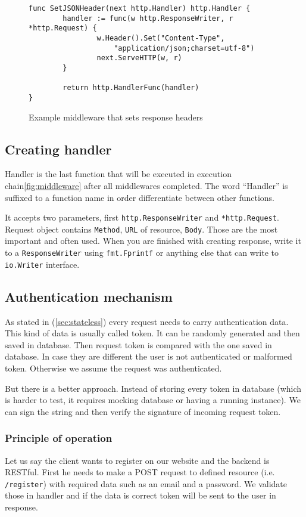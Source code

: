 \begin{figure}[!htbp]
\begin{verbatim}
func SetJSONHeader(next http.Handler) http.Handler {
        handler := func(w http.ResponseWriter, r *http.Request) {
                w.Header().Set("Content-Type",
                    "application/json;charset=utf-8")
                next.ServeHTTP(w, r)
        }

        return http.HandlerFunc(handler)
}
\end{verbatim}
\caption{Example middleware that sets response headers}
\label{src:example-middleware}
\end{figure}

\subsection{Creating handler}
Handler is the last function that will be executed in execution chain\ref{fig:middleware} after all middlewares completed. The word ``Handler'' is suffixed to a function name in order differentiate between other functions.

It accepts two parameters, first \verb|http.ResponseWriter| and \verb|*http.Request|. Request object contains \verb|Method|, \verb|URL| of resource, \verb|Body|. Those are the most important and often used. When you are finished with creating response, write it to a \verb|ResponseWriter| using \verb|fmt.Fprintf| or anything else that can write to \verb|io.Writer| interface.

\subsection{Authentication mechanism}
As stated in (\ref{sec:stateless}) every request needs to carry authentication data. This kind of data is usually called token. It can be randomly generated and then saved in database. Then request token is compared with the one saved in database. In case they are different the user is not authenticated or malformed token. Otherwise we assume the request was authenticated.

But there is a better approach. Instead of storing every token in database (which is harder to test, it requires mocking database or having a running instance). We can sign the string and then verify the signature of incoming request token.

\subsubsection{Principle of operation}
Let us say the client wants to register on our website and the backend is RESTful. First he needs to make a POST request to defined resource (i.e. \verb|/register|) with required data such as an email and a password. We validate those in handler and if the data is correct token will be sent to the user in response.

